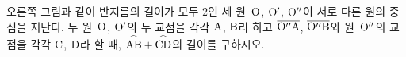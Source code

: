 \noindent\begin{minipage}[t]{0.58\linewidth}\vspace{0pt}\raggedright 오른쪽 그림과 같이 반지름의 길이가 모두 $2$인 세 원~$\mathrm{O}$, $\mathrm{O'}$, $\mathrm{O''}$이 서로 다른 원의 중심을 지난다. 두 원~$\mathrm{O}$, $\mathrm{O'}$의 두 교점을 각각 $\mathrm{A}$, $\mathrm{B}$라 하고 $\overline{\mathrm{O''A}}$, $\overline{\mathrm{O''B}}$와 원~$\mathrm{O''}$의 교점을 각각 $\mathrm{C}$, $\mathrm{D}$라 할 때, $\overset{\frown}{\mathrm{AB}}+\overset{\frown}{\mathrm{CD}}$의 길이를 구하시오.\end{minipage}\hfill\begin{minipage}[t]{0.4\linewidth}\vspace{0pt}\centering \resizebox{\ifdim\width>\linewidth\linewidth\else\width\fi}{!}{}\end{minipage}\par

